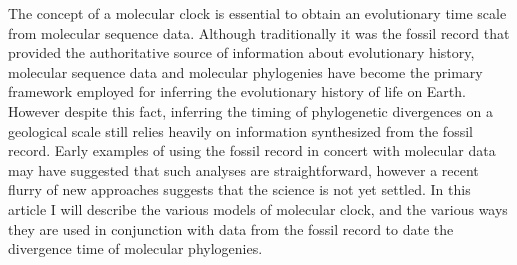 The concept of a molecular clock is essential to obtain an evolutionary time scale from molecular sequence data.
Although traditionally it was the fossil record that provided the authoritative source of information about evolutionary history, molecular sequence data and molecular phylogenies have become the primary framework employed for inferring the evolutionary history of life on Earth. However despite this fact, inferring the timing of phylogenetic divergences on a geological scale still relies heavily on information synthesized from the fossil record. Early examples of using the fossil record in concert with molecular data may have suggested that such analyses are straightforward, however a recent flurry of new approaches suggests that the science is not yet settled. In this article I will describe the various models of molecular clock, and the various ways they are used in conjunction with data from the fossil record to date the divergence time of molecular phylogenies.
  